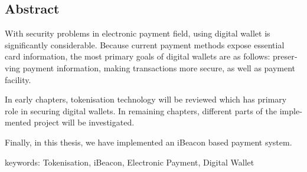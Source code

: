 \documentclass[oneside]{report}
\begin{document}
	
	
	\newpage
	\def\bibname{مراجع}
	
	
	
	\newpage
	
	\begin{latin}
		
		\section*{Abstract}
		{
			\Large
			With security problems in electronic payment field, using digital wallet 
			is significantly considerable. Because current payment methods expose essential card information, the most primary goals of digital wallets are as follows:  preserving payment information, making transactions more secure, as well as payment facility. 
			
			\noindent
			In early chapters, tokenisation technology will be reviewed which has primary role in securing digital wallets. In remaining chapters, different parts of the implemented project will be investigated. 
			
			\noindent
			Finally, in this thesis, we have implemented an iBeacon based payment system.
			
			
			
			\vspace*{1.5cm}
			
			\noindent
			keywords: Tokenisation, iBeacon, Electronic Payment, Digital Wallet 
		}
		
		
	\end{latin}	
	
	\newpage
	
\end{document}
